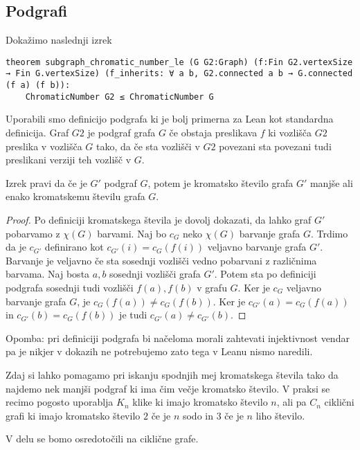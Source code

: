 \documentclass[mat1]{fmfdelo}
\begin{document}
\subsection{Podgrafi}
Dokažimo naslednji izrek
\begin{lstlisting}
theorem subgraph_chromatic_number_le (G G2:Graph) (f:Fin G2.vertexSize → Fin G.vertexSize) (f_inherits: ∀ a b, G2.connected a b → G.connected (f a) (f b)):
    ChromaticNumber G2 ≤ ChromaticNumber G
\end{lstlisting}
Uporabili smo definicijo podgrafa ki je bolj primerna za Lean kot standardna definicija.
Graf $G2$ je podgraf grafa $G$ če obstaja preslikava $f$ ki vozlišča $G2$ preslika v vozlišča $G$ tako, 
da če sta vozlišči v $G2$ povezani sta povezani tudi preslikani verziji teh vozlišč v $G$.

Izrek pravi da če je $G'$ podgraf $G$, potem je kromatsko število grafa $G'$ manjše ali enako kromatskemu številu grafa $G$.
\begin{proof}
Po definiciji kromatskega števila je dovolj dokazati, da lahko graf $G'$ pobarvamo z $\chi(G)$ barvami. Naj bo $c_G$ 
neko $\chi(G)$ barvanje grafa $G$. Trdimo da je $c_{G'}$ definirano kot $c_{G'}(i) = c_G(f(i))$ veljavno barvanje grafa $G'$. 
Barvanje je veljavno če sta sosednji vozlišči vedno pobarvani z različnima barvama. Naj bosta $a, b$ sosednji vozlišči grafa $G'$.
Potem sta po definiciji podgrafa sosednji tudi vozlišči $f(a), f(b)$ v grafu $G$. Ker je $c_G$ veljavno barvanje grafa $G$, je 
$c_G(f(a))\neq c_G(f(b))$. Ker je $c_{G'}(a) = c_G(f(a))$ in $c_{G'}(b) = c_G(f(b))$ je tudi $c_{G'}(a)\neq c_{G'}(b)$.
\end{proof}
Opomba: pri definiciji podgrafa bi načeloma morali zahtevati injektivnost vendar pa je nikjer v dokazih ne potrebujemo zato
tega v Leanu nismo naredili. 

Zdaj si lahko pomagamo pri iskanju spodnjih mej kromatskega števila tako da najdemo nek manjši podgraf ki 
ima čim večje kromatsko število. V praksi se recimo pogosto uporablja $K_n$ klike ki imajo kromatsko število $n$, 
ali pa $C_n$ ciklični grafi ki imajo kromatsko število $2$ če je $n$ sodo in $3$ če je $n$ liho število.

V delu se bomo osredotočili na ciklične grafe.
\end{document}
